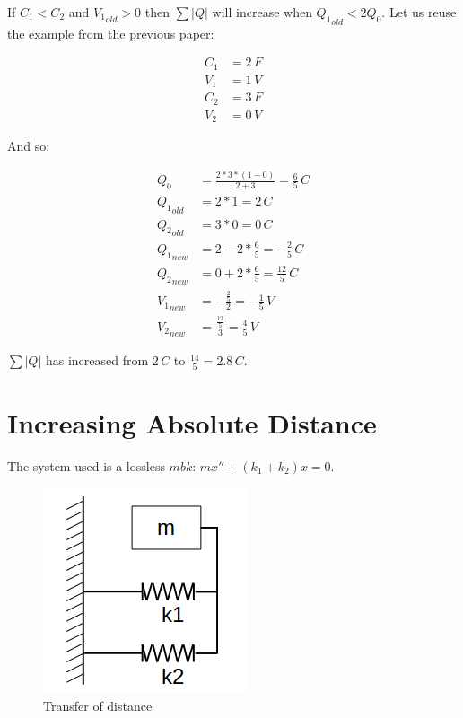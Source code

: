 \documentclass[]{../common/elementary-physics}
\begin{document}
If $C_1 < C_2$ and ${V_1}_{old} > 0$ then $\sum |Q|$ will increase when ${Q_1}_{old} < 2 Q_0$.
Let us reuse the example from the previous paper\cite{ef2ch}:

\begin{subequations}
\begin{align}
C_1 &= 2 \, F \\
V_1 &= 1 \, V \\
C_2 &= 3 \, F \\
V_2 &= 0 \, V
\end{align}
\end{subequations}

And so:

\begin{subequations}
\begin{align}
Q_0 &= \frac{2 * 3 * (1-0)}{2 + 3} = \frac{6}{5} \, C \\
{Q_1}_{old} &= 2 * 1 = 2 \, C \\
{Q_2}_{old} &= 3 * 0 = 0 \, C \\
{Q_1}_{new} &= 2 -2 * \frac{6}{5} = -\frac{2}{5} \, C \\
{Q_2}_{new} &= 0 +2 * \frac{6}{5} = \frac{12}{5} \, C \\
{V_1}_{new} &= -\frac{\frac{2}{5}}{2} = -\frac{1}{5} \, V \\
{V_2}_{new} &= \frac{\frac{12}{5}}{3} = \frac{4}{5} \, V
\end{align}
\end{subequations}

$\sum |Q|$ has increased from $2 \, C$ to $\frac{14}{5} = 2.8 \, C$.

\section{Increasing Absolute Distance}

The system used is a lossless $mbk$\cite{ef3ch}: $m x'' + (k_1 + k_2) x = 0$.

\begin{figure}[ht] \centering
	\includegraphics[scale=.3]{kmk} \caption{Transfer of distance}
\end{figure}
\end{document}
